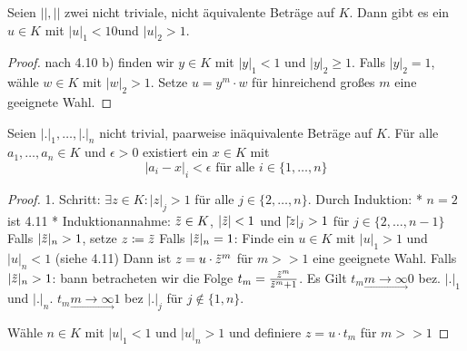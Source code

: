 \documentclass[../main.tex]{subfiles}
\begin{document}
\begin{corollary}
    Seien $||,||$ zwei nicht triviale, nicht äquivalente Beträge auf $K$. Dann gibt es ein $u\in K$ mit $|u|_1 < 1$0und $|u|_2 > 1$.
\end{corollary}
\begin{proof}
    nach 4.10 b) finden wir $y\in K$ mit $|y|_1 <1$ und $|y|_2\geq 1$.
     Falls $|y|_2 = 1$, wähle $w\in K$ mit $|w|_2>1$.
     Setze $u=y^m\cdot w$ für hinreichend großes $m$ eine geeignete Wahl.
\end{proof}

\begin{theorem}[Approximationssatz]
    Seien $|.|_1, \dots,|.|_n$ nicht trivial, paarweise inäquivalente Beträge auf $K$.
    Für alle $a_1,\dots, a_n\in K$ und $\epsilon > 0$ existiert ein $x\in K$ mit $$|a_i-x|_i <\epsilon \text{ für alle } i\in \{1,\dots,n\}$$
\end{theorem}

\begin{proof}
    1. Schritt: $\exists z\in K: |z|_j > 1$ für alle $j\in \{2,\dots,n\}$.
    Durch Induktion: * $n=2$ ist 4.11 \checkmark
    * Induktionannahme: $\Tilde{z}\in K$, $|\Tilde{z}| < 1$ und $|\Tilde{}{z}|_j > 1$ für $j\in \{2,\dots, n-1\}$
    Falls $|\Tilde{z}|_n > 1$, setze $z\coloneqq \Tilde{z}$
    Falls $|\Tilde{z}|_n = 1$: Finde ein $u\in K$ mit $|u|_1 >1$ und $|u|_n <1$ (siehe 4.11)
    Dann ist $z = u\cdot \Tilde{z}^m$ für $m>>1$ eine geeignete Wahl.
    Falls $|\Tilde{z}|_n >1$: bann betracheten wir die Folge $t_m = \frac{\Tilde{z}^m}{\Tilde{z}^m +1}$. Es Gilt $t_m \underset{\longrightarrow}{m\rightarrow\infty} 0$ bez. $|.|_1$ und $|.|_n$.
    $t_m \underset{\longrightarrow}{m\rightarrow\infty} 1$ bez $|.|_j$ für $j\notin \{1,n\}$.

    Wähle $n\in K$ mit $|u|_1<1$ und $|u|_n>1$ und definiere $z=u\cdot t_m$ für $m>>1$
\end{proof}
\end{document}
